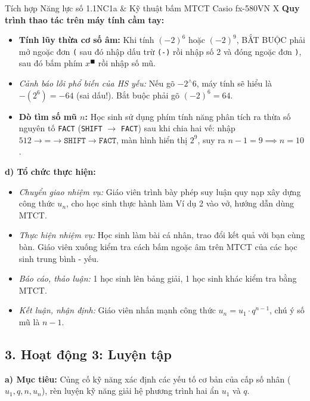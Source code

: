 \documentclass[12pt, a4paper]{article}
\begin{document}
\begin{aibox}{Tích hợp Năng lực số 1.1NC1a \& Kỹ thuật bấm MTCT Casio fx-580VN X}
\textbf{Quy trình thao tác trên máy tính cầm tay:}
\begin{itemize}[leftmargin=0.6cm]
    \item \textbf{Tính lũy thừa cơ số âm:} Khi tính $(-2)^6$ hoặc $(-2)^9$, BẮT BUỘC phải mở ngoặc đơn \texttt{(} sau đó nhập dấu trừ \texttt{(-)} rồi nhập số 2 và đóng ngoặc đơn \texttt{)}, sau đó bấm phím $x^{\blacksquare}$ rồi nhập số mũ.
    \item \textit{Cảnh báo lỗi phổ biến của HS yếu:} Nếu gõ $-2^{\wedge}6$, máy tính sẽ hiểu là $-(2^6) = -64$ (sai dấu!). Bắt buộc phải gõ $(-2)^6 = 64$.
    \item \textbf{Dò tìm số mũ $n$:} Học sinh sử dụng phím tính năng phân tích ra thừa số nguyên tố \texttt{FACT} (\texttt{SHIFT} $\to$ \texttt{FACT}) sau khi chia hai vế: nhập $512 \to \texttt{=} \to \texttt{SHIFT} \to \texttt{FACT}$, màn hình hiển thị $2^9$, suy ra $n - 1 = 9 \implies n = 10$.
\end{itemize}
\end{aibox}

\noindent \textbf{d) Tổ chức thực hiện:}
\begin{itemize}[leftmargin=0.8cm]
    \item \textit{Chuyển giao nhiệm vụ:} Giáo viên trình bày phép suy luận quy nạp xây dựng công thức $u_n$, cho học sinh thực hành làm Ví dụ 2 vào vở, hướng dẫn dùng MTCT.
    \item \textit{Thực hiện nhiệm vụ:} Học sinh làm bài cá nhân, trao đổi kết quả với bạn cùng bàn. Giáo viên xuống kiểm tra cách bấm ngoặc âm trên MTCT của các học sinh trung bình - yếu.
    \item \textit{Báo cáo, thảo luận:} 1 học sinh lên bảng giải, 1 học sinh khác kiểm tra bằng MTCT.
    \item \textit{Kết luận, nhận định:} Giáo viên nhấn mạnh công thức $u_n = u_1 \cdot q^{n-1}$, chú ý số mũ là $n-1$.
\end{itemize}

\subsection*{3. Hoạt động 3: Luyện tập}

\noindent \textbf{a) Mục tiêu:}
Củng cố kỹ năng xác định các yếu tố cơ bản của cấp số nhân ($u_1, q, n, u_n$), rèn luyện kỹ năng giải hệ phương trình hai ẩn $u_1$ và $q$.
\end{document}
